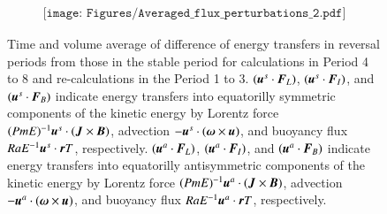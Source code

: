 \begin{figure}[ht]
\begin{center}
\[
\begin{array}{c}
\texttt{[image: Figures/Averaged\_flux\_perturbations\_2.pdf]}
\end{array}
\]
\end{center}
\caption{
 Time and volume average of difference of energy transfers in reversal periods from those in the stable period for calculations in Period 4 to 8 and re-calculations in the Period 1 to 3.
{\color{blue}
$(\mbox{\boldmath$u$}^s \cdot \mbox{\boldmath$F$}_{L})$, $(\mbox{\boldmath$u$}^s \cdot \mbox{\boldmath$F$}_{I})$, and $(\mbox{\boldmath$u$}^s \cdot \mbox{\boldmath$F$}_{B})$ indicate energy transfers into equatorilly symmetric components of the kinetic energy by Lorentz force $(Pm E)^{-1} \mbox{\boldmath$u$}^s \cdot (\mbox{\boldmath$J$} \times \mbox{\boldmath$B$})$, advection $-\mbox{\boldmath$u$}^s \cdot(\mbox{\boldmath$\omega$} \times \mbox{\boldmath$u$})$, and buoyancy flux $Ra E^{-1} \mbox{\boldmath$u$}^s \cdot \mbox{\boldmath$r$} T$, respectively. 
$(\mbox{\boldmath$u$}^a \cdot \mbox{\boldmath$F$}_{L})$, $(\mbox{\boldmath$u$}^a \cdot \mbox{\boldmath$F$}_{I})$, and $(\mbox{\boldmath$u$}^a \cdot \mbox{\boldmath$F$}_{B})$ indicate energy transfers into equatorilly antisymmetric components of the kinetic energy by Lorentz force $(Pm E)^{-1} \mbox{\boldmath$u$}^a \cdot (\mbox{\boldmath$J$} \times \mbox{\boldmath$B$})$, advection $-\mbox{\boldmath$u$}^a \cdot(\mbox{\boldmath$\omega$} \times \mbox{\boldmath$u$})$, and buoyancy flux $Ra E^{-1} \mbox{\boldmath$u$}^a \cdot \mbox{\boldmath$r$} T$, respectively. 
}
}
\label{Fig:Change_flux_summary_6grp}
\end{figure}